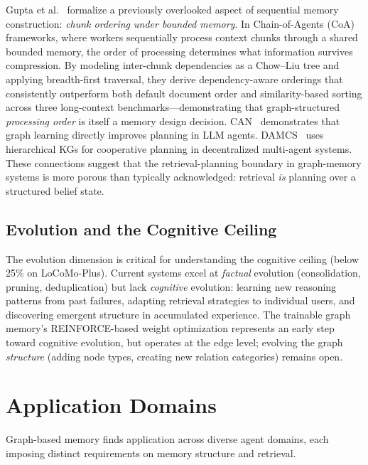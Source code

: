 \documentclass[hf]{ceurart}
\begin{document}
Gupta et al.~\cite{chowliu2026} formalize a previously overlooked
aspect of sequential memory construction: \emph{chunk ordering under
bounded memory}. In Chain-of-Agents (CoA) frameworks, where workers
sequentially process context chunks through a shared bounded memory,
the order of processing determines what information survives
compression. By modeling inter-chunk dependencies as a Chow--Liu
tree and applying breadth-first traversal, they derive
dependency-aware orderings that consistently outperform both default
document order and similarity-based sorting across three long-context
benchmarks---demonstrating that graph-structured \emph{processing
order} is itself a memory design decision.
CAN~\cite{can2024} demonstrates that graph learning directly improves
planning in LLM agents. DAMCS~\cite{damcs2025} uses hierarchical KGs
for cooperative planning in decentralized multi-agent systems. These
connections suggest that the retrieval-planning boundary in
graph-memory systems is more porous than typically acknowledged:
retrieval \emph{is} planning over a structured belief state.

\subsection{Evolution and the Cognitive Ceiling}

The evolution dimension is critical for understanding the cognitive
ceiling (below 25\% on LoCoMo-Plus). Current systems excel at
\emph{factual} evolution (consolidation, pruning, deduplication) but
lack \emph{cognitive} evolution: learning new reasoning patterns from
past failures, adapting retrieval strategies to individual users, and
discovering emergent structure in accumulated experience. The trainable
graph memory's REINFORCE-based weight optimization represents an early
step toward cognitive evolution, but operates at the edge level;
evolving the graph \emph{structure} (adding node types, creating new
relation categories) remains open.


\section{Application Domains}
\label{sec:applications}

Graph-based memory finds application across diverse agent domains,
each imposing distinct requirements on memory structure and retrieval.
\end{document}
